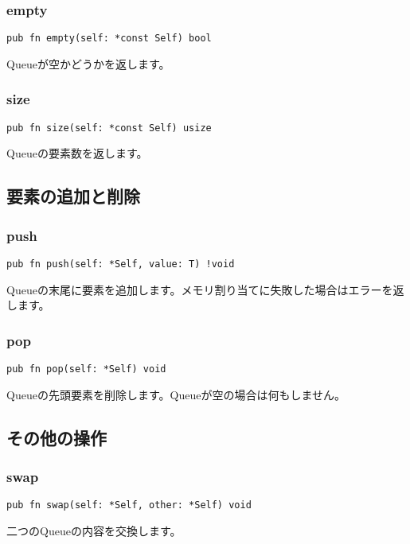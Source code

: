 \documentclass{ltjsarticle}
\begin{document}
\subsubsection{empty}
\begin{lstlisting}[style=zigstyle]
pub fn empty(self: *const Self) bool
\end{lstlisting}
Queueが空かどうかを返します。

\subsubsection{size}
\begin{lstlisting}[style=zigstyle]
pub fn size(self: *const Self) usize
\end{lstlisting}
Queueの要素数を返します。

\subsection{要素の追加と削除}

\subsubsection{push}
\begin{lstlisting}[style=zigstyle]
pub fn push(self: *Self, value: T) !void
\end{lstlisting}
Queueの末尾に要素を追加します。メモリ割り当てに失敗した場合はエラーを返します。

\subsubsection{pop}
\begin{lstlisting}[style=zigstyle]
pub fn pop(self: *Self) void
\end{lstlisting}
Queueの先頭要素を削除します。Queueが空の場合は何もしません。

\subsection{その他の操作}

\subsubsection{swap}
\begin{lstlisting}[style=zigstyle]
pub fn swap(self: *Self, other: *Self) void
\end{lstlisting}
二つのQueueの内容を交換します。
\end{document}
